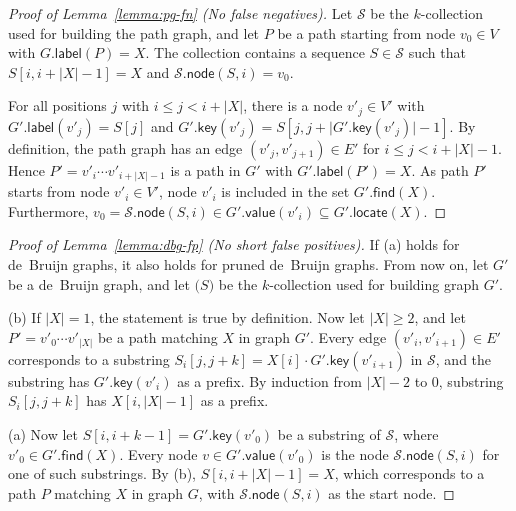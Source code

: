 \documentclass[a4paper,UKenglish]{lipics-v2016}
\newcommand{\abs}[1]{\ensuremath{\lvert #1 \rvert}}
\newcommand{\find}{\ensuremath{\mathsf{find}}}
\newcommand{\locate}{\ensuremath{\mathsf{locate}}}
\newcommand{\glabel}{\ensuremath{\mathsf{label}}}
\newcommand{\gkey}{\ensuremath{\mathsf{key}}}
\newcommand{\gvalue}{\ensuremath{\mathsf{value}}}
\newcommand{\gnode}{\ensuremath{\mathsf{node}}}
\newcommand{\kcollection}[1]{$#1$\nobreakdash-collection}
\begin{document}
\begin{proof}[Proof of Lemma~\ref{lemma:pg-fn} (No false negatives)]
Let $\mathcal{S}$ be the \kcollection{k} used for building the path graph, and let $P$ be a path starting from node $v_{0} \in V$ with $G.\glabel(P) = X$. The collection contains a sequence $S \in \mathcal{S}$ such that $S[i, i+\abs{X}-1] = X$ and $\mathcal{S}.\gnode(S, i) = v_{0}$.

For all positions $j$ with $i \le j < i+\abs{X}$, there is a node $v'_{j} \in V'$ with $G'.\glabel(v'_{j}) = S[j]$ and $G'.\gkey(v'_{j}) = S[j, j+\abs{G'.\gkey(v'_{j})}-1]$.
By definition, the path graph has an edge $(v'_{j}, v'_{j+1}) \in E'$ for $i \le j < i+\abs{X}-1$.
Hence $P' = v'_{i} \dotsm v'_{i+\abs{X}-1}$ is a path in $G'$ with $G'.\glabel(P') = X$.
As path $P'$ starts from node $v'_{i} \in V'$, node $v'_{i}$ is included in the set $G'.\find(X)$.
Furthermore, $v_{0} = \mathcal{S}.\gnode(S, i) \in G'.\gvalue(v'_{i}) \subseteq G'.\locate(X)$.
\end{proof}

\begin{proof}[Proof of Lemma~\ref{lemma:dbg-fp} (No short false positives)]
If (a) holds for de~Bruijn graphs, it also holds for pruned de~Bruijn graphs. From now on, let $G'$ be a de~Bruijn graph, and let $\mathcal(S)$ be the \kcollection{k} used for building graph $G'$.

(b) If $\abs{X} = 1$, the statement is true by definition. Now let $\abs{X} \ge 2$, and let $P' = v'_{0} \dotsm v'_{\abs{X}}$ be a path matching $X$ in graph $G'$. Every edge $(v'_{i}, v'_{i+1}) \in E'$ corresponds to a substring $S_{i}[j, j+k] = X[i] \cdot G'.\gkey(v'_{i+1})$ in $\mathcal{S}$, and the substring has $G'.\gkey(v'_{i})$ as a prefix. By induction from $\abs{X}-2$ to $0$, substring $S_{i}[j, j+k]$ has $X[i, \abs{X}-1]$ as a prefix.

(a) Now let $S[i, i+k-1] = G'.\gkey(v'_{0})$ be a substring of $\mathcal{S}$, where $v'_{0} \in G'.\find(X)$. Every node $v \in G'.\gvalue(v'_{0})$ is the node $\mathcal{S}.\gnode(S, i)$ for one of such substrings. By (b), $S[i, i+\abs{X}-1] = X$, which corresponds to a path $P$ matching $X$ in graph $G$, with $\mathcal{S}.\gnode(S, i)$ as the start node.
\end{proof}
\end{document}
